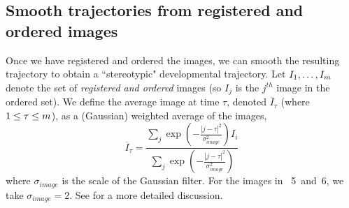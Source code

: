 %
%
%
%
%




\subsection{Smooth trajectories from registered and ordered images} \label{sec:smooth_traj}

Once we have registered and ordered the images, we can smooth the resulting trajectory to obtain a ``stereotypic" developmental trajectory.
%
Let $I_1, \dots, I_m$ denote the set of {\em registered and ordered} images (so $I_j$ is the $j^{th}$ image in the ordered set).
%
We define the average image at time $\tau$, denoted $\overline{I}_{\tau}$ (where $1 \le \tau \le m$), as a (Gaussian) weighted average of the images,
\begin{equation}
\overline{I}_{\tau} =  \frac{\sum_j \exp \left( - \frac{|j - \tau|^2}{\sigma_{image}^2} \right) I_i}{\sum_j \exp \left( - \frac{|j - \tau|^2}{\sigma_{image}^2} \right) }
\end{equation}
where $\sigma_{image}$ is the scale of the Gaussian filter.
%
For the images in \fig~5~and~6, we take $\sigma_{image} = 2$.
%
See \citep{kemelmacher2011exploring} for a more detailed discussion.







